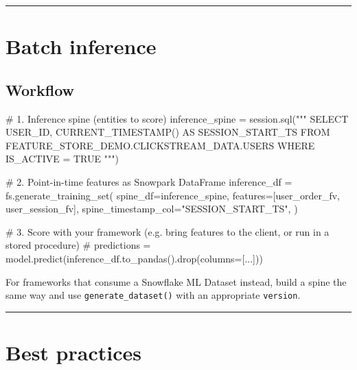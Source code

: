 \documentclass[
  letterpaper,
  DIV=11,
  numbers=noendperiod]{scrreprt}
\newenvironment{Shaded}{\begin{snugshade}}{\end{snugshade}}
\newcommand{\CommentTok}[1]{\textcolor[rgb]{0.37,0.37,0.37}{#1}}
\newcommand{\NormalTok}[1]{\textcolor[rgb]{0.00,0.23,0.31}{#1}}
\newcommand{\OperatorTok}[1]{\textcolor[rgb]{0.37,0.37,0.37}{#1}}
\newcommand{\StringTok}[1]{\textcolor[rgb]{0.13,0.47,0.30}{#1}}
\begin{document}
\begin{center}\rule{0.5\linewidth}{0.5pt}\end{center}

\hypertarget{batch-inference}{%
\section{Batch inference}\label{batch-inference}}

\hypertarget{workflow}{%
\subsection{Workflow}\label{workflow}}

\begin{Shaded}
\begin{Highlighting}[]
\CommentTok{\# 1. Inference spine (entities to score)}
\NormalTok{inference\_spine }\OperatorTok{=}\NormalTok{ session.sql(}\StringTok{"""}
\StringTok{    SELECT}
\StringTok{        USER\_ID,}
\StringTok{        CURRENT\_TIMESTAMP() AS SESSION\_START\_TS}
\StringTok{    FROM FEATURE\_STORE\_DEMO.CLICKSTREAM\_DATA.USERS}
\StringTok{    WHERE IS\_ACTIVE = TRUE}
\StringTok{"""}\NormalTok{)}

\CommentTok{\# 2. Point{-}in{-}time features as Snowpark DataFrame}
\NormalTok{inference\_df }\OperatorTok{=}\NormalTok{ fs.generate\_training\_set(}
\NormalTok{    spine\_df}\OperatorTok{=}\NormalTok{inference\_spine,}
\NormalTok{    features}\OperatorTok{=}\NormalTok{[user\_order\_fv, user\_session\_fv],}
\NormalTok{    spine\_timestamp\_col}\OperatorTok{=}\StringTok{"SESSION\_START\_TS"}\NormalTok{,}
\NormalTok{)}

\CommentTok{\# 3. Score with your framework (e.g. bring features to the client, or run in a stored procedure)}
\CommentTok{\# predictions = model.predict(inference\_df.to\_pandas().drop(columns=[...]))}
\end{Highlighting}
\end{Shaded}

For frameworks that consume a Snowflake ML Dataset instead, build a
spine the same way and use \texttt{generate\_dataset()} with an
appropriate \texttt{version}.

\begin{center}\rule{0.5\linewidth}{0.5pt}\end{center}

\hypertarget{best-practices-8}{%
\section{Best practices}\label{best-practices-8}}
\end{document}
